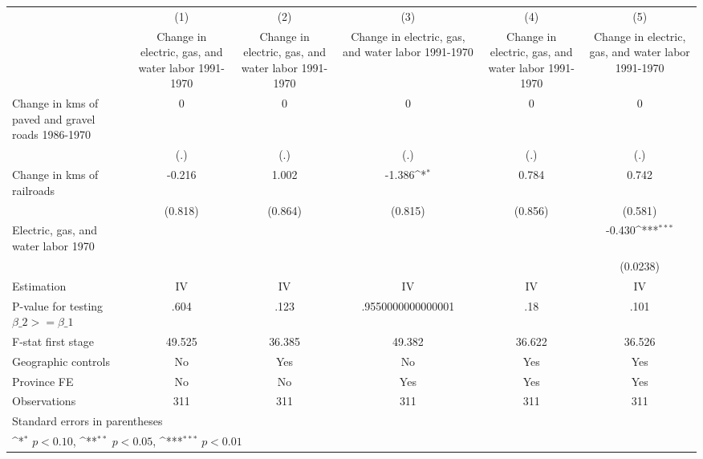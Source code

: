 {
\def\sym#1{\ifmmode^{#1}\else\(^{#1}\)\fi}
\begin{tabular}{l*{5}{c}}
\hline\hline
                    &\multicolumn{1}{c}{(1)}&\multicolumn{1}{c}{(2)}&\multicolumn{1}{c}{(3)}&\multicolumn{1}{c}{(4)}&\multicolumn{1}{c}{(5)}\\
                    &\multicolumn{1}{c}{Change in electric, gas, and water labor 1991-1970}&\multicolumn{1}{c}{Change in electric, gas, and water labor 1991-1970}&\multicolumn{1}{c}{Change in electric, gas, and water labor 1991-1970}&\multicolumn{1}{c}{Change in electric, gas, and water labor 1991-1970}&\multicolumn{1}{c}{Change in electric, gas, and water labor 1991-1970}\\
\hline
Change in kms of paved and gravel roads 1986-1970&           0         &           0         &           0         &           0         &           0         \\
                    &         (.)         &         (.)         &         (.)         &         (.)         &         (.)         \\
[1em]
Change in kms of railroads&      -0.216         &       1.002         &      -1.386\sym{*}  &       0.784         &       0.742         \\
                    &     (0.818)         &     (0.864)         &     (0.815)         &     (0.856)         &     (0.581)         \\
[1em]
Electric, gas, and water labor 1970&                     &                     &                     &                     &      -0.430\sym{***}\\
                    &                     &                     &                     &                     &    (0.0238)         \\
\hline
Estimation          &          IV         &          IV         &          IV         &          IV         &          IV         \\
P-value for testing $\beta\_2 >= \beta\_1$&        .604         &        .123         &.9550000000000001         &         .18         &        .101         \\
F-stat first stage  &      49.525         &      36.385         &      49.382         &      36.622         &      36.526         \\
Geographic controls &          No         &         Yes         &          No         &         Yes         &         Yes         \\
Province FE         &          No         &          No         &         Yes         &         Yes         &         Yes         \\
Observations        &         311         &         311         &         311         &         311         &         311         \\
\hline\hline
\multicolumn{6}{l}{\footnotesize Standard errors in parentheses}\\
\multicolumn{6}{l}{\footnotesize \sym{*} \(p<0.10\), \sym{**} \(p<0.05\), \sym{***} \(p<0.01\)}\\
\end{tabular}
}
